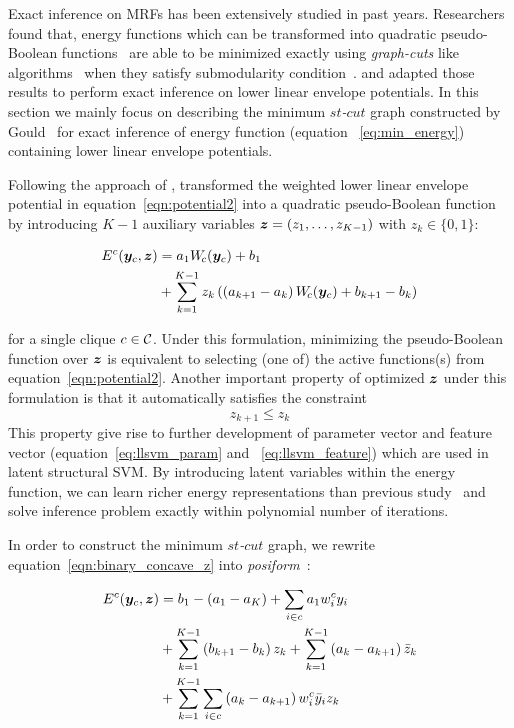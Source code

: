 Exact inference on MRFs has been extensively studied in past
years. Researchers found that, energy functions which can be
transformed into quadratic pseudo-Boolean
functions~\cite{Ishikawa:PAMI03,Ishikawa:CVPR09,Rother:CVPR09}
are able to be minimized exactly using \emph{graph-cuts} like
algorithms~\cite{Freedman:CVPR05,Hammer:1965} when they satisfy
submodularity condition~\cite{Boros:MATH02}.
 and  adapted those
results to perform exact inference on lower linear envelope
potentials. In this section we mainly focus on describing the
minimum \emph{$st$-$cut$} graph constructed by
Gould~\cite{Gould:ICML2011,gouldlearning} for exact inference of
energy function (equation ~\eqref{eq:min_energy}) containing
lower linear envelope potentials.

Following the approach of ,
 transformed the weighted
lower linear envelope potential in
equation~\eqref{eqn:potential2} into a quadratic pseudo-Boolean
function by introducing $K-1$ auxiliary variables ${\bm{z}} =
\left(z_1, \ldots, z_{K-1}\right)$ with $z_k\in \{0,1\}$:

\begin{align}
  E^c({\bm{y}}_c, {\bm{z}}) &= a_1 W_{\!c}({\bm{y}}_c) + b_1 \notag \\
  &+ \sum_{k = 1}^{K-1} z_k \left( \left(a_{k+1} - a_k\right) W_{\!c}({\bm{y}}_c) + b_{k+1} - b_k \right)
  \label{eqn:binary_concave_z}
\end{align}

\noindent for a single clique $c \in \cal C$. Under this
formulation, minimizing the pseudo-Boolean function over ${\bm{z}}$ is
equivalent to selecting (one of) the active functions(s) from
equation~\eqref{eqn:potential2}. Another important property of
optimized ${\bm{z}}$ under this formulation is that it automatically
satisfies the constraint
%
$$z_{k+1} \leq z_k$$
%
This property give rise to further development of parameter
vector and feature vector (equation~\eqref{eq:llsvm_param} and
~\eqref{eq:llsvm_feature}) which are used in latent structural
SVM. By introducing latent variables within the energy function,
we can learn richer energy representations than previous
study~\cite{gouldlearning} and solve inference problem exactly
within polynomial number of iterations.

In order to construct the minimum \emph{$st$-$cut$} graph, we
rewrite equation~\eqref{eqn:binary_concave_z} into
\emph{posiform}~\cite{Boros:MATH02}:

\begin{align}
  \label{eqn:posiform}  
  E^c({\bm{y}}_c, {\bm{z}})
  &= b_1 - (a_1 - a_K) + \sum_{i \in c} a_1 w^c_i y_i \notag\\
  & + \sum_{k = 1}^{K - 1} \left( b_{k+1} - b_k \right) z_k
    + \sum_{k = 1}^{K - 1} \left( a_k - a_{k+1} \right)
    \bar{z}_k\notag\\
  & + \sum_{k = 1}^{K - 1} \sum_{i \in c} \left( a_k - a_{k+1}
    \right) w^c_i \bar{y}_i z_k
\end{align}

